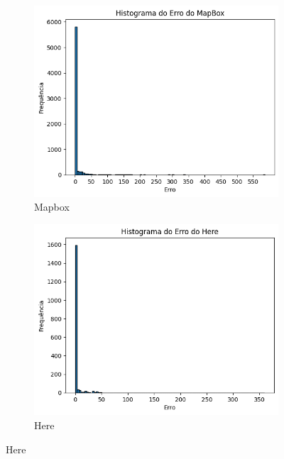 \begin{figure}[ht]
  \centering
  \begin{subfigure}[b]{0.45\textwidth}
    \includegraphics[width=\textwidth]{Figuras/hist1.png}
    \caption{Mapbox}
    \label{fig:hist1}
  \end{subfigure}
  \hfill
  \begin{subfigure}[b]{0.45\textwidth}
    \includegraphics[width=\textwidth]{Figuras/hist2.png}
    \caption{Here}
    \label{fig:hist2}
  \end{subfigure}


\end{figure}
